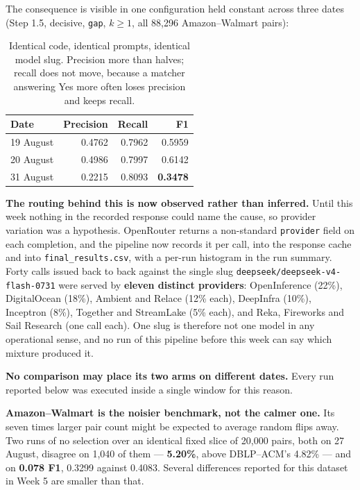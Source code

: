 \documentclass[11pt]{article}
\begin{document}
The consequence is visible in one configuration held constant across three dates
(Step 1.5, decisive, \texttt{gap}, $k \ge 1$, all 88{,}296 Amazon--Walmart pairs):

\begin{table}[H]
\centering
\begin{tabular}{lrrr}
\toprule
Date & Precision & Recall & F1 \\
\midrule
19 August & 0.4762 & 0.7962 & 0.5959 \\
20 August & 0.4986 & 0.7997 & 0.6142 \\
31 August & 0.2215 & 0.8093 & \textbf{0.3478} \\
\bottomrule
\end{tabular}
\caption{Identical code, identical prompts, identical model slug. Precision more than halves;
recall does not move, because a matcher answering Yes more often loses precision and keeps
recall.}
\end{table}

\textbf{The routing behind this is now observed rather than inferred.} Until this week
nothing in the recorded response could name the cause, so provider variation was a
hypothesis. OpenRouter returns a non-standard \texttt{provider} field on each completion, and
the pipeline now records it per call, into the response cache and into
\texttt{final\_results.csv}, with a per-run histogram in the run summary. Forty calls issued
back to back against the single slug \texttt{deepseek/deepseek-v4-flash-0731} were served by
\textbf{eleven distinct providers}: OpenInference (22\%), DigitalOcean (18\%), Ambient and
Relace (12\% each), DeepInfra (10\%), Inceptron (8\%), Together and StreamLake (5\% each),
and Reka, Fireworks and Sail Research (one call each). One slug is therefore not one model in
any operational sense, and no run of this pipeline before this week can say which mixture
produced it.

\textbf{No comparison may place its two arms on different dates.} Every run reported below
was executed inside a single window for this reason.

\textbf{Amazon--Walmart is the noisier benchmark, not the calmer one.} Its seven times larger
pair count might be expected to average random flips away. Two runs of no selection over an
identical fixed slice of 20{,}000 pairs, both on 27 August, disagree on 1{,}040 of them ---
\textbf{5.20\%}, above DBLP--ACM's 4.82\% --- and on \textbf{0.078 F1}, 0.3299 against
0.4083. Several differences reported for this dataset in Week 5 are smaller than that.
\end{document}
